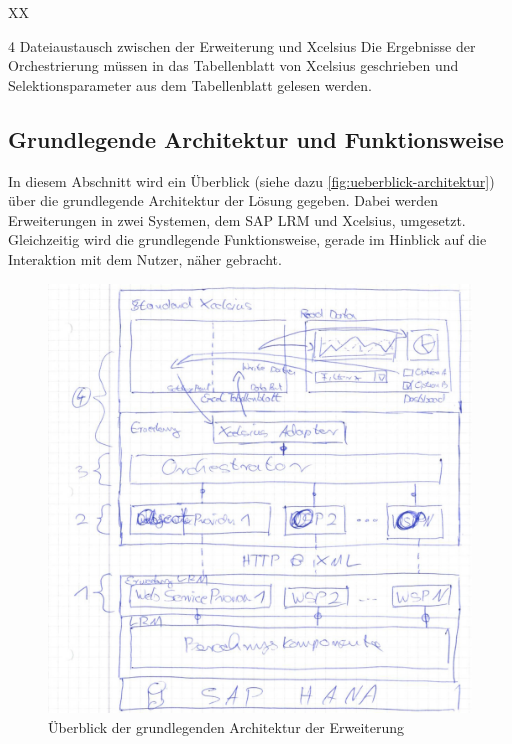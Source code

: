 \begin{onehalfspacing}
\begin{seToplist} { XX }
\item[4] Dateiaustausch zwischen der Erweiterung und \gls{Xcelsius} \newline
Die Ergebnisse der Orchestrierung müssen in das Tabellenblatt von \gls{Xcelsius} geschrieben und Selektionsparameter aus dem Tabellenblatt gelesen werden.

\end{seToplist}

\subsection{Grundlegende Architektur und Funktionsweise}
In diesem Abschnitt wird ein Überblick (siehe dazu \vref{fig:ueberblick-architektur}) über die grundlegende Architektur der Lösung gegeben. Dabei werden Erweiterungen in zwei Systemen, dem SAP LRM und \gls{Xcelsius}, umgesetzt. Gleichzeitig wird die grundlegende Funktionsweise, gerade im Hinblick auf die Interaktion mit dem Nutzer, näher gebracht.

\begin{figure}[h]
\centering
\setlength{\unitlength}{1mm}
\includegraphics[width=15cm]{images/Ueberblick-Architektur.jpg}
\caption{Überblick der grundlegenden Architektur der Erweiterung\label{fig:ueberblick-architektur}}
\end{figure} 


\end{onehalfspacing}
